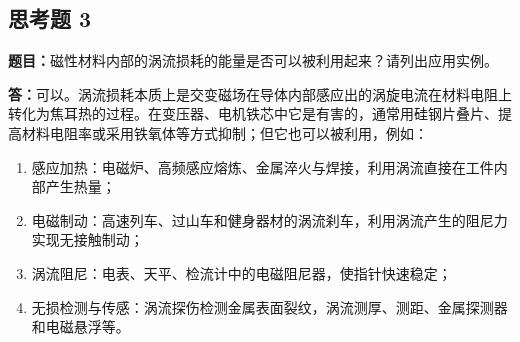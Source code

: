 \documentclass{Phyport}
\begin{document}
\subsection*{思考题 3}
\textbf{题目：}磁性材料内部的涡流损耗的能量是否可以被利用起来？请列出应用实例。

\textbf{答：}可以。涡流损耗本质上是交变磁场在导体内部感应出的涡旋电流在材料电阻上转化为焦耳热的过程。在变压器、电机铁芯中它是有害的，通常用硅钢片叠片、提高材料电阻率或采用铁氧体等方式抑制；但它也可以被利用，例如：
\begin{enumerate}
    \item 感应加热：电磁炉、高频感应熔炼、金属淬火与焊接，利用涡流直接在工件内部产生热量；
    \item 电磁制动：高速列车、过山车和健身器材的涡流刹车，利用涡流产生的阻尼力实现无接触制动；
    \item 涡流阻尼：电表、天平、检流计中的电磁阻尼器，使指针快速稳定；
    \item 无损检测与传感：涡流探伤检测金属表面裂纹，涡流测厚、测距、金属探测器和电磁悬浮等。
\end{enumerate}


\end{document}
